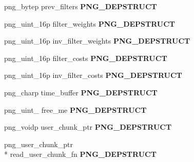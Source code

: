 \begin{DoxyCompactItemize}
\item 
\hypertarget{structpng__struct__def_a5d09ad981d9676b130d410123fe51978}{png\-\_\-bytep prev\-\_\-filters {\bfseries P\-N\-G\-\_\-\-D\-E\-P\-S\-T\-R\-U\-C\-T}}\label{structpng__struct__def_a5d09ad981d9676b130d410123fe51978}

\item 
\hypertarget{structpng__struct__def_ae84f67d113e29cee8cfd50b46dca84da}{png\-\_\-uint\-\_\-16p filter\-\_\-weights {\bfseries P\-N\-G\-\_\-\-D\-E\-P\-S\-T\-R\-U\-C\-T}}\label{structpng__struct__def_ae84f67d113e29cee8cfd50b46dca84da}

\item 
\hypertarget{structpng__struct__def_a1eb1a2b25c203abb05d1287064d48690}{png\-\_\-uint\-\_\-16p inv\-\_\-filter\-\_\-weights {\bfseries P\-N\-G\-\_\-\-D\-E\-P\-S\-T\-R\-U\-C\-T}}\label{structpng__struct__def_a1eb1a2b25c203abb05d1287064d48690}

\item 
\hypertarget{structpng__struct__def_a0d125f7841c27b6891e99dc6964856bd}{png\-\_\-uint\-\_\-16p filter\-\_\-costs {\bfseries P\-N\-G\-\_\-\-D\-E\-P\-S\-T\-R\-U\-C\-T}}\label{structpng__struct__def_a0d125f7841c27b6891e99dc6964856bd}

\item 
\hypertarget{structpng__struct__def_a01ed21a156d4390e7cb1d498d1908636}{png\-\_\-uint\-\_\-16p inv\-\_\-filter\-\_\-costs {\bfseries P\-N\-G\-\_\-\-D\-E\-P\-S\-T\-R\-U\-C\-T}}\label{structpng__struct__def_a01ed21a156d4390e7cb1d498d1908636}

\item 
\hypertarget{structpng__struct__def_a445cb624d1d1a88d40a4d352117b5210}{png\-\_\-charp time\-\_\-buffer {\bfseries P\-N\-G\-\_\-\-D\-E\-P\-S\-T\-R\-U\-C\-T}}\label{structpng__struct__def_a445cb624d1d1a88d40a4d352117b5210}

\item 
\hypertarget{structpng__struct__def_ada97b33695dd3406cd86e152d8a92bb0}{png\-\_\-uint\-\_ free\-\_\-me {\bfseries P\-N\-G\-\_\-\-D\-E\-P\-S\-T\-R\-U\-C\-T}}\label{structpng__struct__def_ada97b33695dd3406cd86e152d8a92bb0}

\item 
\hypertarget{structpng__struct__def_a0927a86f66d2969d435ff22bfb41cfb3}{png\-\_\-voidp user\-\_\-chunk\-\_\-ptr {\bfseries P\-N\-G\-\_\-\-D\-E\-P\-S\-T\-R\-U\-C\-T}}\label{structpng__struct__def_a0927a86f66d2969d435ff22bfb41cfb3}

\item 
\hypertarget{structpng__struct__def_ae097ba0dfbdd0d8713087c8dd4a43cc0}{png\-\_\-user\-\_\-chunk\-\_\-ptr \\*
read\-\_\-user\-\_\-chunk\-\_\-fn {\bfseries P\-N\-G\-\_\-\-D\-E\-P\-S\-T\-R\-U\-C\-T}}\label{structpng__struct__def_ae097ba0dfbdd0d8713087c8dd4a43cc0}


\end{DoxyCompactItemize}
